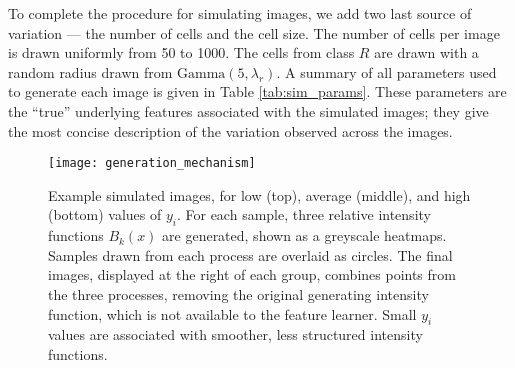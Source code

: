 To complete the procedure for simulating images, we add two last source of
variation — the number of cells and the cell size. The number of cells per image
is drawn uniformly from 50 to 1000. The cells from class $R$ are drawn with a
random radius drawn from $\text{Gamma}\left(5, \lambda_{r}\right)$. A summary of
all parameters used to generate each image is given in Table
\ref{tab:sim_params}. These parameters are the ``true'' underlying features
associated with the simulated images; they give the most concise description of
the variation observed across the images.

\begin{figure}
  \centering
  \texttt{[image: generation\_mechanism]}
  \caption{Example simulated images, for low (top), average (middle), and high
    (bottom) values of $y_i$. For each sample, three relative intensity
    functions $B_{k}\left(x\right)$ are generated, shown as a greyscale
    heatmaps. Samples drawn from each process are overlaid as circles. The final
    images, displayed at the right of each group, combines points from the three
    processes, removing the original generating intensity function, which is not
    available to the feature learner. Small $y_i$ values are associated with
    smoother, less structured intensity functions.}
  \label{fig:matern_example}
\end{figure}

